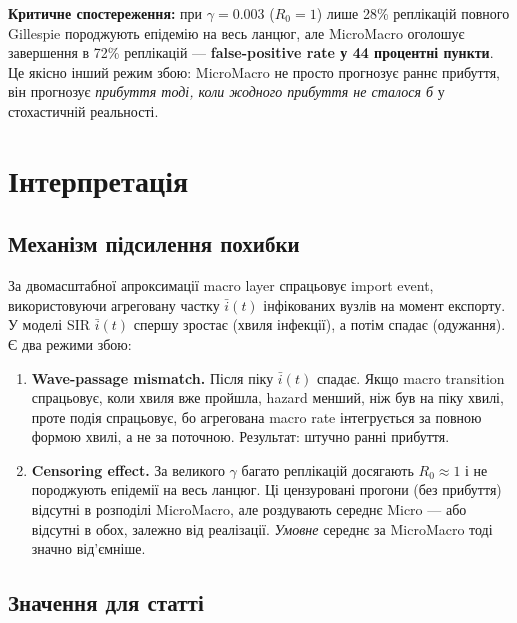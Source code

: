 \documentclass[11pt,a4paper]{article}
\begin{document}
\textbf{Критичне спостереження:} при $\gamma = 0.003$ ($R_0 = 1$) лише 28\%
реплікацій повного Gillespie породжують епідемію на весь ланцюг, але MicroMacro
оголошує завершення в 72\% реплікацій --- \textbf{false-positive rate
у 44 процентні пункти}.  Це якісно інший режим збою:
MicroMacro не просто прогнозує раннє прибуття, він прогнозує \emph{прибуття
тоді, коли жодного прибуття не сталося б} у стохастичній реальності.

\section{Інтерпретація}

\subsection{Механізм підсилення похибки}

За двомасштабної апроксимації macro layer спрацьовує import event,
використовуючи агреговану частку $\bar{i}(t)$ інфікованих вузлів на момент
експорту.  У моделі SIR $\bar{i}(t)$ спершу зростає (хвиля інфекції), а
потім спадає (одужання).  Є два режими збою:

\begin{enumerate}
  \item \textbf{Wave-passage mismatch.}  Після піку $\bar{i}(t)$
        спадає.  Якщо macro transition спрацьовує, коли хвиля вже пройшла,
        hazard менший, ніж був на піку хвилі, проте подія
        спрацьовує, бо агрегована macro rate інтегрується за повною
        формою хвилі, а не за поточною.  Результат: штучно ранні прибуття.

  \item \textbf{Censoring effect.}  За великого $\gamma$ багато реплікацій
        досягають $R_0 \approx 1$ і не породжують епідемії на весь ланцюг.
        Ці цензуровані прогони (без прибуття) відсутні в розподілі
        MicroMacro, але роздувають середнє Micro --- або відсутні в обох,
        залежно від реалізації.  \emph{Умовне} середнє за
        MicroMacro тоді значно від'ємніше.
\end{enumerate}

\subsection{Значення для статті}
\end{document}
